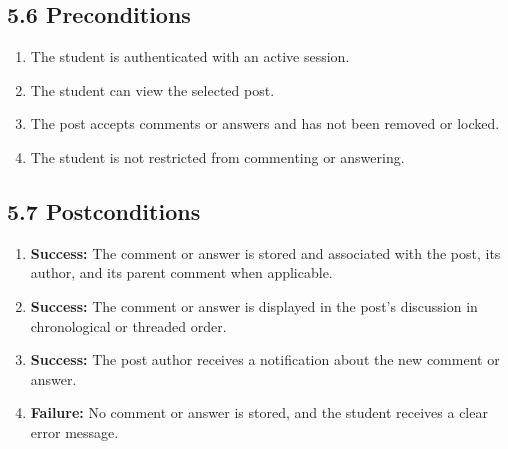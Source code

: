 \documentclass[12pt]{article}
\begin{document}
\subsection*{5.6 Preconditions}
\par\medskip
\begin{enumerate}
\item The student is authenticated with an active session.
\item The student can view the selected post.
\item The post accepts comments or answers and has not been removed or locked.
\item The student is not restricted from commenting or answering.
\end{enumerate}
\par\medskip
\hypertarget{sec:5-7-postconditions}{}
\subsection*{5.7 Postconditions}
\par\medskip
\begin{enumerate}
\item \textbf{Success:} The comment or answer is stored and associated with the post, its author, and its parent comment when applicable.
\item \textbf{Success:} The comment or answer is displayed in the post's discussion in chronological or threaded order.
\item \textbf{Success:} The post author receives a notification about the new comment or answer.
\item \textbf{Failure:} No comment or answer is stored, and the student receives a clear error message.
\end{enumerate}
\par\medskip
\hypertarget{sec:5-8-extension-points}{}
\end{document}
